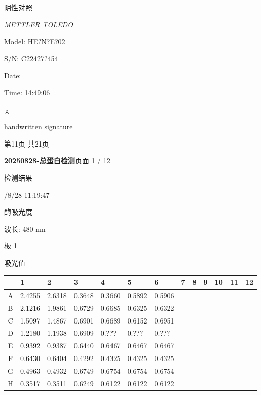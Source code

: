 \documentclass[UTF8,10pt,a4paper,fontset=fandol]{ctexart}
\newcommand{\handwritten}[1]{#1}
\begin{document}
\vspace{5mm}

\handwritten{阴性对照}

\vspace{4mm}

\noindent
\textit{METTLER TOLEDO}

\noindent
Model: HE?N?E?02

\noindent
S/N: C22427?454

\noindent
Date:

\noindent
Time: 14:49:06

\,g

\vspace{5mm}

\handwritten{handwritten signature}

\begin{center}
第11页 共21页
\end{center}

\newpage

\noindent\textbf{20250828-总蛋白检测}\hfill 页面 1 / 12

\medskip
\noindent 检测结果

/8/28 11:19:47

\noindent 酶吸光度

\noindent 波长: 480 nm

\medskip
\noindent 板 1

\noindent 吸光值

\begin{center}
\scriptsize
\begin{tabular}{c|*{12}{p{0.42cm}|}}
 & 1 & 2 & 3 & 4 & 5 & 6 & 7 & 8 & 9 & 10 & 11 & 12\\ \hline
A & 2.4255 & 2.6318 & 0.3648 & 0.3660 & 0.5892 & 0.5906 & & & & & & \\ \hline
B & 2.1216 & 1.9861 & 0.6729 & 0.6685 & 0.6325 & 0.6322 & & & & & & \\ \hline
C & 1.5097 & 1.4867 & 0.6901 & 0.6689 & 0.6152 & 0.6951 & & & & & & \\ \hline
D & 1.2180 & 1.1938 & 0.6909 & 0.??? & 0.??? & 0.??? & & & & & & \\ \hline
E & 0.9392 & 0.9387 & 0.6440 & 0.6467 & 0.6467 & 0.6467 & & & & & & \\ \hline
F & 0.6430 & 0.6404 & 0.4292 & 0.4325 & 0.4325 & 0.4325 & & & & & & \\ \hline
G & 0.4963 & 0.4932 & 0.6749 & 0.6754 & 0.6754 & 0.6754 & & & & & & \\ \hline
H & 0.3517 & 0.3511 & 0.6249 & 0.6122 & 0.6122 & 0.6122 & & & & & & \\ \hline
\end{tabular}
\end{center}
\end{document}
